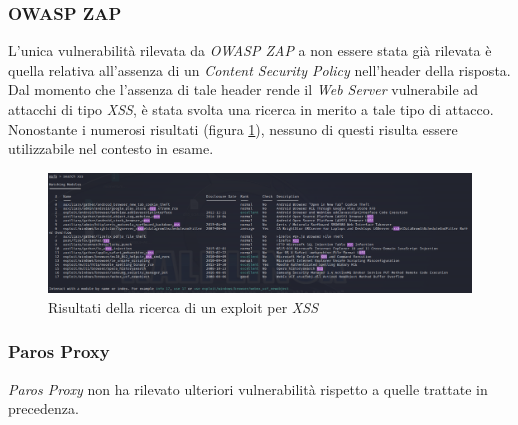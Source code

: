 \subsubsection{OWASP ZAP}
L'unica vulnerabilità rilevata da \emph{OWASP ZAP} a non essere stata già rilevata è quella relativa all'assenza di un \emph{Content Security Policy} nell'header della risposta. Dal momento che l'assenza di tale header rende il \emph{Web Server} vulnerabile ad attacchi di tipo \emph{XSS}, è stata svolta una ricerca in merito a tale tipo di attacco. Nonostante i numerosi risultati (figura \ref{fig:metasploit_xss}), nessuno di questi risulta essere utilizzabile nel contesto in esame.
\begin{figure}[h]
    \centering
    \includegraphics[scale=0.3]{capitoli/images/metasploit_xss.png}
    \caption{Risultati della ricerca di un exploit per \emph{XSS}}
    \label{fig:metasploit_xss}
\end{figure}

\subsubsection{Paros Proxy}
\emph{Paros Proxy} non ha rilevato ulteriori vulnerabilità rispetto a quelle trattate in precedenza. 
